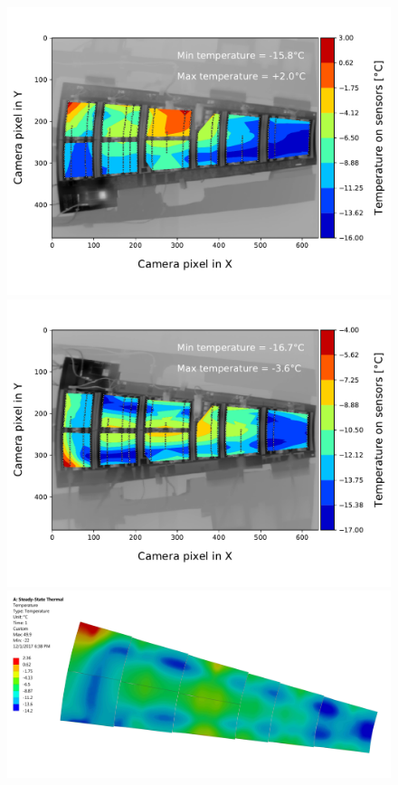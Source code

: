 		\begin{figure}[ht!]
			\centering
			\captionsetup{justification=centering,margin=0cm}
			\includegraphics[scale=0.39]{Figures/Chapter04/thermogram_markers_2_201711271001.pdf}
			\includegraphics[scale=0.39]{Figures/Chapter04/thermogram_markers_9_201711271006.pdf}
			\includegraphics[scale=0.045]{Figures/Chapter04/FEA_thermogram_markers_2_201711271001.jpg}

\end{figure}
